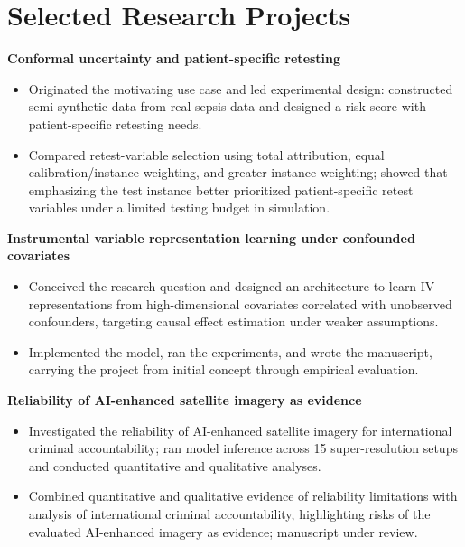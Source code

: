 \documentclass[a4paper,10pt]{article}
\begin{document}
\section{Selected Research Projects}
\textbf{Conformal uncertainty and patient-specific retesting}\par
\begin{itemize}
\item Originated the motivating use case and led experimental design: constructed semi-synthetic data from real sepsis data and designed a risk score with patient-specific retesting needs.
\item Compared retest-variable selection using total attribution, equal calibration/instance weighting, and greater instance weighting; showed that emphasizing the test instance better prioritized patient-specific retest variables under a limited testing budget in simulation.
\end{itemize}
\vspace{1pt}
\textbf{Instrumental variable representation learning under confounded covariates}\par
\begin{itemize}
\item Conceived the research question and designed an architecture to learn IV representations from high-dimensional covariates correlated with unobserved confounders, targeting causal effect estimation under weaker assumptions.
\item Implemented the model, ran the experiments, and wrote the manuscript, carrying the project from initial concept through empirical evaluation.
\end{itemize}
\vspace{1pt}
\textbf{Reliability of AI-enhanced satellite imagery as evidence}\par
\begin{itemize}
\item Investigated the reliability of AI-enhanced satellite imagery for international criminal accountability; ran model inference across 15 super-resolution setups and conducted quantitative and qualitative analyses.
\item Combined quantitative and qualitative evidence of reliability limitations with analysis of international criminal accountability, highlighting risks of the evaluated AI-enhanced imagery as evidence; manuscript under review.
\end{itemize}
\vspace{1pt}
\newpage
\end{document}
